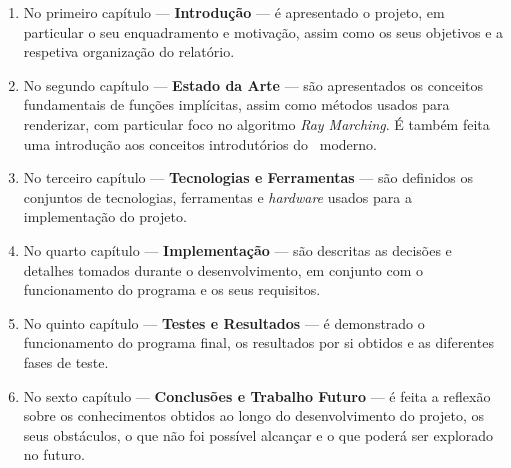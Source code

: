 \begin{enumerate}
	\item No primeiro capítulo --- \textbf{Introdução} --- é apresentado o projeto, em particular o seu enquadramento e motivação, assim como os seus objetivos e a respetiva organização do relatório.
	
	\item No segundo capítulo --- \textbf{Estado da Arte} --- são apresentados os conceitos fundamentais de funções implícitas, assim como métodos usados para renderizar, com particular foco no algoritmo \textit{Ray Marching}. É também feita uma introdução aos conceitos introdutórios do \opengl~moderno.
	
	\item No terceiro capítulo --- \textbf{Tecnologias e Ferramentas} --- são definidos os conjuntos de tecnologias, ferramentas e \textit{hardware} usados para a implementação do projeto.
	
	\item No quarto capítulo --- \textbf{Implementação} --- são descritas as decisões e detalhes tomados durante o desenvolvimento, em conjunto com o funcionamento do programa e os seus requisitos.
	
	\item No quinto capítulo --- \textbf{Testes e Resultados} --- é demonstrado o funcionamento do programa final, os resultados por si obtidos e as diferentes fases de teste.
	
	\item No sexto capítulo --- \textbf{Conclusões e Trabalho Futuro} --- é feita a reflexão sobre os conhecimentos obtidos ao longo do desenvolvimento do projeto, os seus obstáculos, o que não foi possível alcançar e o que poderá ser explorado no futuro.
\end{enumerate}
